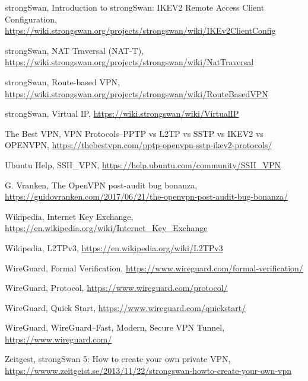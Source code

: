 \begin{thebibliography}{10}
  strongSwan, Introduction to strongSwan: IKEV2 Remote Access Client Configuration,
  \url{https://wiki.strongswan.org/projects/strongswan/wiki/IKEv2ClientConfig}

  strongSwan, NAT Traversal (NAT-T),
  \url{https://wiki.strongswan.org/projects/strongswan/wiki/NatTraversal}

  strongSwan, Route-based VPN,
  \url{https://wiki.strongswan.org/projects/strongswan/wiki/RouteBasedVPN}

  strongSwan, Virtual IP,
  \url{https://wiki.strongswan/wiki/VirtualIP}

  The Best VPN, VPN Protocols--PPTP vs L2TP vs SSTP vs IKEV2 vs OPENVPN,
  \url{https://thebestvpn.com/pptp-openvpn-sstp-ikev2-protocols/}

  Ubuntu Help, SSH\_VPN,
  \url{https://help.ubuntu.com/community/SSH_VPN}

  G. Vranken, The OpenVPN post-audit bug bonanza,
  \url{https://guidovranken.com/2017/06/21/the-openvpn-post-audit-bug-bonanza/}

  Wikipedia, Internet Key Exchange,
  \url{https://en.wikipedia.org/wiki/Internet_Key_Exchange}

  Wikipedia, L2TPv3,
  \url{https://en.wikipedia.org/wiki/L2TPv3}

  WireGuard, Formal Verification,
  \url{https://www.wireguard.com/formal-verification/}

  WireGuard, Protocol,
  \url{https://www.wireguard.com/protocol/}

  WireGuard, Quick Start,
  \url{https://www.wireguard.com/quickstart/}

  WireGuard, WireGuard--Fast, Modern, Secure VPN Tunnel,
  \url{https://www.wireguard.com/}

  Zeitgest, strongSwan 5: How to create your own private VPN,
  \url{https://wwww.zeitgeist.se/2013/11/22/strongswan-howto-create-your-own-vpn}

\end{thebibliography}
